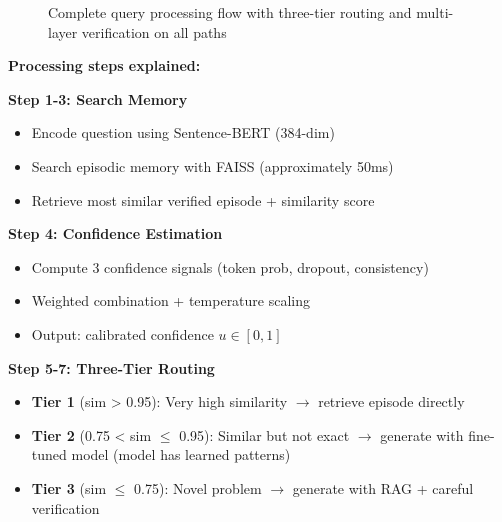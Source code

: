 \documentclass[12pt,a4paper]{article}
\theoremstyle{definition}
\begin{document}
\begin{figure}[htbp]
\caption{Complete query processing flow with three-tier routing and multi-layer verification on all paths}
\label{fig:query-flow}
\end{figure}

\textbf{Processing steps explained:}

\textbf{Step 1-3: Search Memory}
\begin{itemize}
    \item Encode question using Sentence-BERT (384-dim)
    \item Search episodic memory with FAISS (approximately 50ms)
    \item Retrieve most similar verified episode + similarity score
\end{itemize}

\textbf{Step 4: Confidence Estimation}
\begin{itemize}
    \item Compute 3 confidence signals (token prob, dropout, consistency)
    \item Weighted combination + temperature scaling
    \item Output: calibrated confidence $u \in [0, 1]$
\end{itemize}

\textbf{Step 5-7: Three-Tier Routing}
\begin{itemize}
    \item \textbf{Tier 1} (sim > 0.95): Very high similarity $\rightarrow$ retrieve episode directly
    \item \textbf{Tier 2} (0.75 < sim $\leq$ 0.95): Similar but not exact $\rightarrow$ generate with fine-tuned model (model has learned patterns)
    \item \textbf{Tier 3} (sim $\leq$ 0.75): Novel problem $\rightarrow$ generate with RAG + careful verification
\end{itemize}
\end{document}
